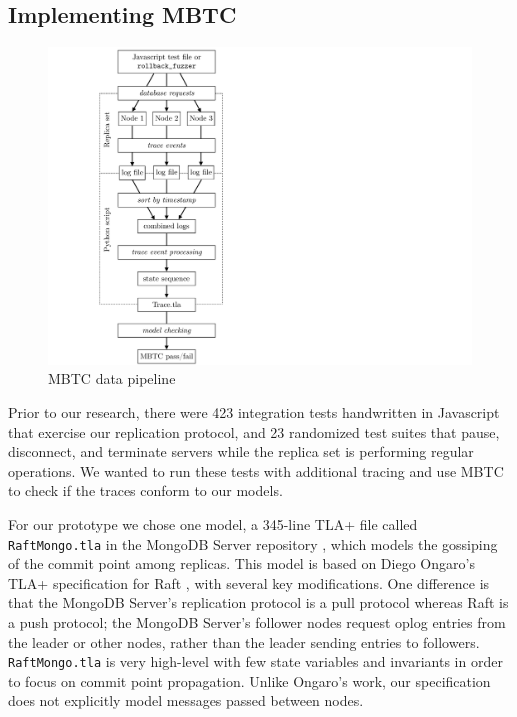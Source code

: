 \documentclass{vldb}
\begin{document}
\subsection{Implementing MBTC}
\label{subsec:mbtc_solution}

\begin{figure}
\includegraphics[width=\textwidth]{MBTC-pipeline.pdf}
\caption{MBTC data pipeline}
\label{figure:MBTC-pipline}
\end{figure}

Prior to our research, there were 423 integration tests handwritten in Javascript that exercise our replication protocol, and 23 randomized test suites that pause, disconnect, and terminate servers while the replica set is performing regular operations. 
We wanted to run these tests with additional tracing and use MBTC to check if the traces conform to our models.

For our prototype we chose one model, a 345-line TLA+ file called \texttt{RaftMongo.tla} in the MongoDB Server repository \cite{MongoGitHub}, which models the gossiping of the commit point among replicas.
This model is based on Diego Ongaro's TLA+ specification for Raft \cite{Ongaro14TLA+Raft}, with several key modifications.
One difference is that the MongoDB Server's replication protocol is a pull protocol whereas Raft is a push protocol; the MongoDB Server's follower nodes request oplog entries from the leader or other nodes, rather than the leader sending entries to followers.
\texttt{RaftMongo.tla} is very high-level with few state variables and invariants in order to focus on commit point propagation. Unlike Ongaro's work, our specification does not explicitly model messages passed between nodes.
\end{document}
